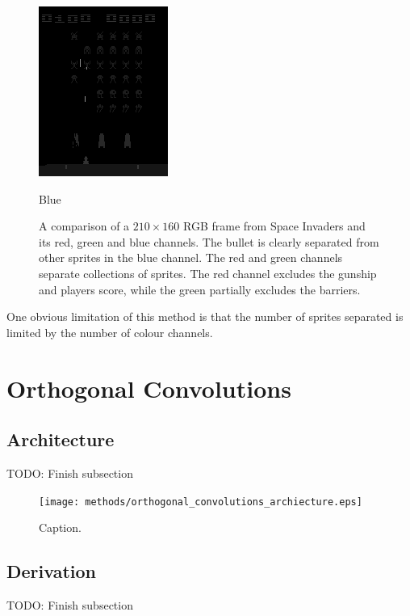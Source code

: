 \begin{figure}[h!]
\begin{multicols}{4}
    \includegraphics[scale=0.7]{figures/methods/separating_colour_spaces_b.png}
    \caption{Blue}
\end{multicols}
\caption{A comparison of a $210 \times 160$ RGB frame from Space Invaders and its red, green and blue channels. The bullet is clearly separated from other sprites in the blue channel. The red and green channels separate collections of sprites. The red channel excludes the gunship and players score, while the green partially excludes the barriers.}
\label{fig:separating_colour_spaces}
\end{figure}


One obvious limitation of this method is that the number of sprites separated is limited by the number of colour channels.


%
%
%
%
%
\section{Orthogonal Convolutions}
\lipsum[2]
\subsection{Architecture}
TODO: Finish subsection
\begin{figure}[h!]
\centering
\captionsetup{justification=centering}
\texttt{[image: methods/orthogonal\_convolutions\_archiecture.eps]}
\caption{Caption.}
\label{fig:orthogonal_convolutions_archiecture}
\end{figure}

\subsection{Derivation}
TODO: Finish subsection